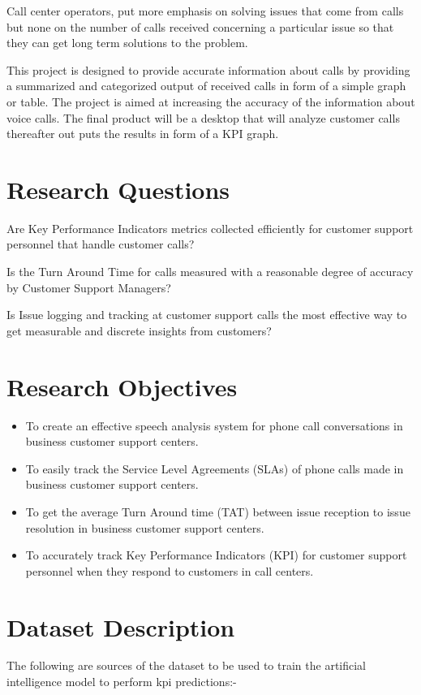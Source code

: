 \documentclass[conference]{IEEEtran}
\begin{document}
Call center operators, put more emphasis on solving issues that come from calls but none on the number of calls received concerning a particular issue so that they can get long term solutions to the problem.

This project is designed to provide accurate information about calls by providing a summarized and categorized output of received calls in form of a simple graph or table. The project is aimed at increasing the accuracy of the information about voice calls. The final product will be a desktop that will analyze customer calls thereafter out puts the results in form of a KPI graph.


\section{Research Questions}
Are Key Performance Indicators metrics collected efficiently for customer support personnel that handle customer calls?

Is the Turn Around Time for calls measured with a reasonable degree of accuracy by Customer Support Managers?

Is Issue logging and tracking at customer support calls the most effective way to get measurable and discrete insights from customers?

\section{Research Objectives}
\begin{itemize}
\item To create an effective speech analysis system for phone call conversations in business customer support centers.
\item To easily track the Service Level Agreements (SLAs) of phone calls made in business customer support centers.
\item To get the average Turn Around time (TAT) between issue reception to issue resolution in business customer support centers.
\item To accurately track Key Performance Indicators (KPI) for customer support personnel when they respond to customers in call centers.
\end{itemize}

\section{Dataset Description}
The following are sources of the dataset to be used to train the artificial intelligence model to perform kpi predictions:-
\end{document}
